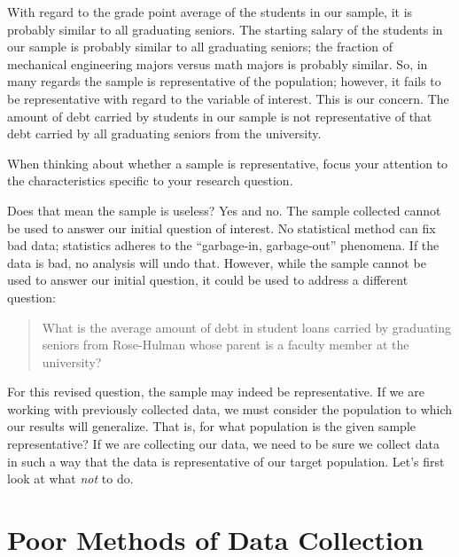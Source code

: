\documentclass[
]{book}
\theoremstyle{plain}
\theoremstyle{mydefn}
\theoremstyle{myexmpl}
\theoremstyle{remark}
\begin{document}
With regard to the grade point average of the students in our sample, it is probably similar to all graduating seniors. The starting salary of the students in our sample is probably similar to all graduating seniors; the fraction of mechanical engineering majors versus math majors is probably similar. So, in many regards the sample is representative of the population; however, it fails to be representative with regard to the variable of interest. This is our concern. The amount of debt carried by students in our sample is not representative of that debt carried by all graduating seniors from the university.

\begin{rmdtip}
When thinking about whether a sample is representative, focus your attention to the characteristics specific to your research question.
\end{rmdtip}

Does that mean the sample is useless? Yes and no. The sample collected cannot be used to answer our initial question of interest. No statistical method can fix bad data; statistics adheres to the ``garbage-in, garbage-out'' phenomena. If the data is bad, no analysis will undo that. However, while the sample cannot be used to answer our initial question, it could be used to address a different question:

\begin{quote}
What is the average amount of debt in student loans carried by graduating seniors from Rose-Hulman whose parent is a faculty member at the university?
\end{quote}

For this revised question, the sample may indeed be representative. If we are working with previously collected data, we must consider the population to which our results will generalize. That is, for what population is the given sample representative? If we are collecting our data, we need to be sure we collect data in such a way that the data is representative of our target population. Let's first look at what \emph{not} to do.

\hypertarget{poor-methods-of-data-collection}{%
\section{Poor Methods of Data Collection}\label{poor-methods-of-data-collection}}
\end{document}
